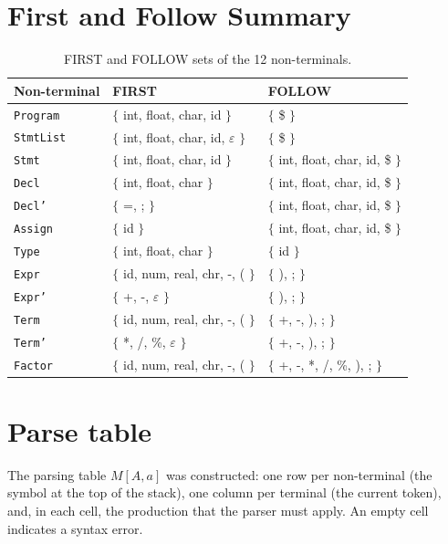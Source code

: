 \documentclass[12pt,letterpaper]{article}
\newcommand{\cod}[1]{\texttt{#1}} %
\newcommand{\anchotabla}{0.9\textwidth} %
\begin{document}
\section{First and Follow Summary}
\begin{table}[H]
\centering
\renewcommand{\arraystretch}{1.2}
\begin{tabular}{@{}p{0.20\dimexpr\anchotabla} p{0.38\dimexpr\anchotabla} p{0.38\dimexpr\anchotabla}@{}}
\toprule
\textbf{Non-terminal} & \textbf{FIRST} & \textbf{FOLLOW} \\
\midrule
\cod{Program}  & $\{$ int, float, char, id $\}$       & $\{$ \$ $\}$ \\
\cod{StmtList} & $\{$ int, float, char, id, $\varepsilon$ $\}$ & $\{$ \$ $\}$ \\
\cod{Stmt}     & $\{$ int, float, char, id $\}$       & $\{$ int, float, char, id, \$ $\}$ \\
\cod{Decl}     & $\{$ int, float, char $\}$           & $\{$ int, float, char, id, \$ $\}$ \\
\cod{Decl'}    & $\{$ =, ; $\}$                       & $\{$ int, float, char, id, \$ $\}$ \\
\cod{Assign}   & $\{$ id $\}$                         & $\{$ int, float, char, id, \$ $\}$ \\
\cod{Type}     & $\{$ int, float, char $\}$           & $\{$ id $\}$ \\
\cod{Expr}     & $\{$ id, num, real, chr, -, ( $\}$   & $\{$ ), ; $\}$ \\
\cod{Expr'}    & $\{$ +, -, $\varepsilon$ $\}$        & $\{$ ), ; $\}$ \\
\cod{Term}     & $\{$ id, num, real, chr, -, ( $\}$   & $\{$ +, -, ), ; $\}$ \\
\cod{Term'}    & $\{$ *, /, \%, $\varepsilon$ $\}$    & $\{$ +, -, ), ; $\}$ \\
\cod{Factor}   & $\{$ id, num, real, chr, -, ( $\}$   & $\{$ +, -, *, /, \%, ), ; $\}$ \\
\bottomrule
\end{tabular}
\caption{FIRST and FOLLOW sets of the 12 non-terminals.}
\end{table}

\section{Parse table}
The parsing table $M[A, a]$ was constructed: one row per non-terminal (the symbol at the top of the stack), one column per terminal (the current token), and, in each cell, the production that the parser must apply. An empty cell indicates a syntax error.\\
\end{document}
